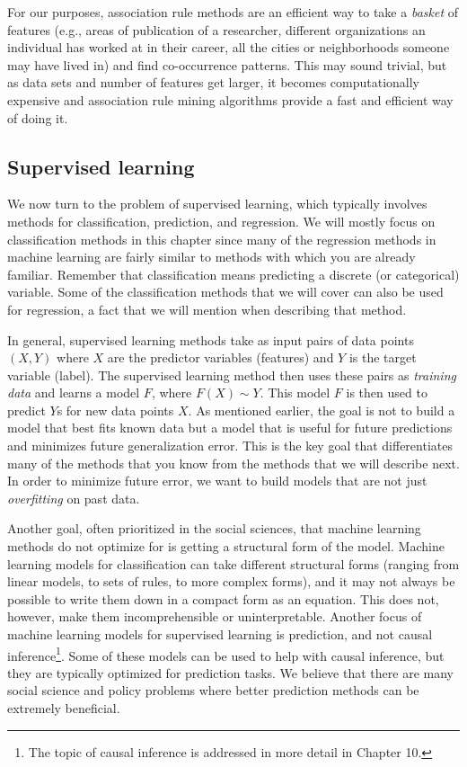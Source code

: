 \documentclass[]{krantz}
\begin{document}
For our purposes, association rule methods are an efficient way to take
a \emph{basket} of features (e.g., areas of publication of a researcher,
different organizations an individual has worked at in their career, all
the cities or neighborhoods someone may have lived in) and find
co-occurrence patterns. This may sound trivial, but as data sets and
number of features get larger, it becomes computationally expensive and
association rule mining algorithms provide a fast and efficient way of
doing it.

\subsection{Supervised learning}\label{sec:MLchapter:super}

We now turn to the problem of supervised learning, which typically
involves methods for classification, prediction, and regression. We will
mostly focus on classification methods in this chapter since many of the
regression methods in machine learning are fairly similar to methods
with which you are already familiar. Remember that classification means
predicting a discrete (or categorical) variable. Some of the
classification methods that we will cover can also be used for
regression, a fact that we will mention when describing that method.

In general, supervised learning methods take as input pairs of data
points \((X,Y)\) where \(X\) are the predictor variables (features) and
\(Y\) is the target variable (label). The supervised learning method
then uses these pairs as \emph{training data} and learns a model \(F\),
where \(F(X)\sim Y\). This model \(F\) is then used to predict \(Y\)s
for new data points \(X\). As mentioned earlier, the goal is not to
build a model that best fits known data but a model that is useful for
future predictions and minimizes future generalization error. This is
the key goal that differentiates many of the methods that you know from
the methods that we will describe next. In order to minimize future
error, we want to build models that are not just \emph{overfitting} on
past data.

Another goal, often prioritized in the social sciences, that machine
learning methods do not optimize for is getting a structural form of the
model. Machine learning models for classification can take different
structural forms (ranging from linear models, to sets of rules, to more
complex forms), and it may not always be possible to write them down in
a compact form as an equation. This does not, however, make them
incomprehensible or uninterpretable. Another focus of machine learning
models for supervised learning is prediction, and not causal
inference\footnote{The topic of causal inference is addressed in more
  detail in Chapter 10.}. Some of these models can be used to help with
causal inference, but they are typically optimized for prediction tasks.
We believe that there are many social science and policy problems where
better prediction methods can be extremely beneficial.
\end{document}
